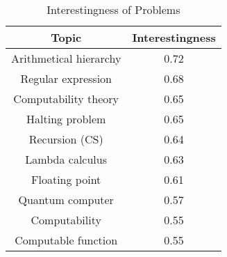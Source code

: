 \begin{table}
\begin{centering}
\begin{tabular}{|c|c|}
\hline 
Topic & Interestingness\tabularnewline
\hline 
\hline 
Arithmetical hierarchy & 0.72\tabularnewline
\hline 
Regular expression & 0.68\tabularnewline
\hline 
Computability theory & 0.65\tabularnewline
\hline 
Halting problem & 0.65\tabularnewline
\hline 
Recursion (CS) & 0.64\tabularnewline
\hline 
Lambda calculus & 0.63\tabularnewline
\hline 
Floating point & 0.61\tabularnewline
\hline 
Quantum computer & 0.57\tabularnewline
\hline 
Computability & 0.55\tabularnewline
\hline 
Computable function & 0.55\tabularnewline
\hline 
\end{tabular}
\par\end{centering}

\caption{\label{tab:Interestingness-of-Problems}Interestingness of Problems}
\end{table}

